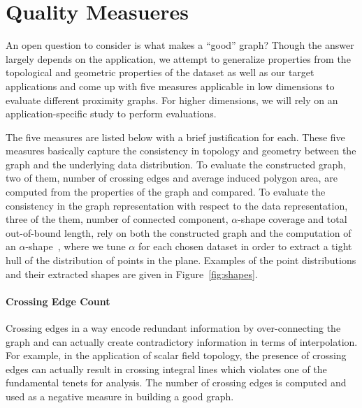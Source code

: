 \section{Quality Measueres}
\label{sec:graph_quality_measures}
An open question to consider is what makes a ``good'' graph?
%
Though the answer largely depends on the application, we attempt to generalize properties from the topological and geometric properties of the dataset as well as our target applications and come up with five measures applicable in low dimensions to evaluate different proximity graphs.
%
For higher dimensions, we will rely on an application-specific study to perform evaluations.

The five measures are listed below with a brief justification for each.
%
These five measures basically capture the consistency in topology and geometry between the graph and the underlying data distribution.
%
To evaluate the constructed graph, two of them, number of crossing edges and average induced polygon area, are computed from the properties of the graph and compared.
%
To evaluate the consistency in the graph representation with respect to the data representation, three of the them, number of connected component, $\alpha$-shape coverage and total out-of-bound length, rely on both the constructed graph and the computation of an $\alpha$-shape~\cite{EdelsbrunnerKirkpatrickSeidel1983}, where we tune $\alpha$ for each chosen dataset in order to extract a tight hull of the distribution of points in the plane.
%
Examples of the point distributions and their extracted shapes are given in Figure~\ref{fig:shapes}.

\paragraph{\textbf{Crossing Edge Count}} %
%
Crossing edges in a way encode redundant information by over-connecting the graph and can actually create contradictory information in terms of interpolation.
%
For example, in the application of scalar field topology, the presence of crossing edges can actually result in crossing integral lines which violates one of the fundamental tenets for analysis.
%
The number of crossing edges is computed and used as a negative measure in building a good graph.

